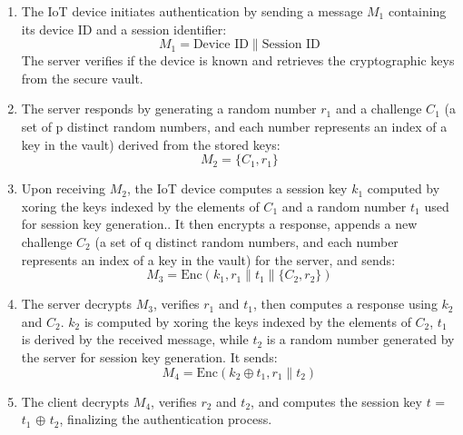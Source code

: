 \documentclass[10pt,twocolumn,letterpaper]{article}
\begin{document}
\begin{enumerate}
    \item The IoT device initiates authentication by sending a message $M_1$ containing its device ID and a session identifier:
          \begin{equation}
              M_1 = \text{Device ID} \parallel \text{Session ID}
          \end{equation}
          The server verifies if the device is known and retrieves the cryptographic keys from the secure vault.

    \item The server responds by generating a random number $r_1$ and a challenge $C_1$ (a set of p distinct random numbers, and each number represents an index of a key in the vault) derived from the stored keys:
          \begin{equation}
              M_2 = \{ C_1, r_1 \}
          \end{equation}

    \item Upon receiving $M_2$, the IoT device computes a session key $k_1$ computed by xoring the keys indexed by the elements of $C_1$ and a random number $t_1$ used for session key generation.. It then encrypts a response,
          appends a new challenge $C_2$ (a set of q distinct random numbers, and each number represents an index of a key in the vault) for the server, and sends:
          \begin{equation}
              M_3 = \text{Enc}(k_1, r_1 \parallel t_1 \parallel \{ C_2, r_2 \})
          \end{equation}

    \item The server decrypts $M_3$, verifies $r_1$ and $t_1$, then computes a response using $k_2$ and $C_2$.
          $k_2$ is computed by xoring the keys indexed by the elements of $C_2$, $t_1$ is derived by the received message,
          while $t_2$ is a random number generated by the server for session key generation.
          It sends:
          \begin{equation}
              M_4 = \text{Enc}(k_2 \oplus t_1, r_1 \parallel t_2)
          \end{equation}

    \item The client decrypts $M_4$, verifies $r_2$ and $t_2$, and computes the session key $t$ = $t_1$ $\oplus$ $t_2$, finalizing the authentication process.
\end{enumerate}
\end{document}
